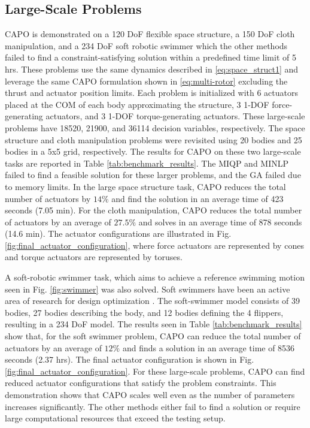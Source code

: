 \documentclass[runningheads]{llncs}
\newcommand{\todo}[1]{\textcolor{red}{TODO: #1}}
\begin{document}
\subsection{Large-Scale Problems}\label{sec:results:large_scale}
CAPO is demonstrated on a 120 DoF flexible space structure, a 150 DoF cloth manipulation, and a 234 DoF soft robotic swimmer which the other methods failed to find a constraint-satisfying solution within a predefined time limit of 5 hrs. These problems use the same dynamics described in \eqref{eq:space_struct1} and leverage the same CAPO formulation shown in \eqref{eq:multi-rotor} excluding the thrust and actuator position limits. Each problem is initialized with 6 actuators placed at the COM of each body approximating the structure, 3 1-DOF force-generating actuators, and 3 1-DOF torque-generating actuators. These large-scale problems have 18520, 21900, and 36114 decision variables, respectively. The space structure and cloth manipulation problems were revisited using 20 bodies and 25 bodies in a 5x5 grid, respectively. The results for CAPO on these two large-scale tasks are reported in Table \ref{tab:benchmark_results}. The MIQP and MINLP failed to find a feasible solution for these larger problems, and the GA failed due to memory limits. In the large space structure task, CAPO reduces the total number of actuators by $14\%$ and find the solution in an average time of 423 seconds (7.05 min). For the cloth manipulation, CAPO reduces the total number of actuators by an average of $27.5\%$ and solves in an average time of 878 seconds (14.6 min). {The actuator configurations are illustrated in Fig. \ref{fig:final_actuator_configuration}, where force actuators are represented by cones and torque actuators are represented by toruses.}

A soft-robotic swimmer task, which aims to achieve a reference swimming motion seen in Fig. \ref{fig:swimmer} was also solved. Soft swimmers have been an active area of research for design optimization \cite{patel2023highly, nava2022fast, lee2023aquarium}. The soft-swimmer model consists of 39 bodies, 27 bodies describing the body, and 12 bodies defining the 4 flippers, resulting in a 234 DoF model. The results seen in Table \ref{tab:benchmark_results} show that, for the soft swimmer problem, CAPO can reduce the total number of actuators by an average of $12\%$ and finds a solution in an average time of 8536 seconds (2.37 hrs). {The final actuator configuration is shown in Fig. \ref{fig:final_actuator_configuration}.} For these large-scale problems, CAPO can find reduced actuator configurations that satisfy the problem constraints. This demonstration shows that CAPO scales well even as the number of parameters increases significantly. The other methods either fail to find a solution or require large computational resources that exceed the testing setup.
\vspace{-40pt}
\end{document}
